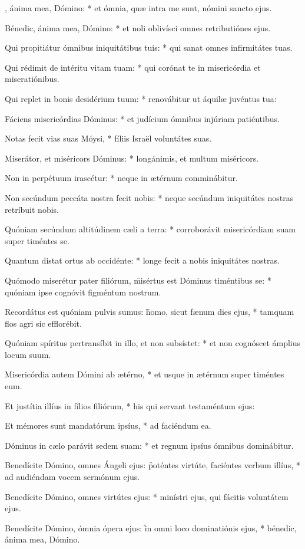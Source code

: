 \begin{psalmus}

, ánima mea, Dómino: * et ómnia, quæ intra me sunt, nómini sancto ejus.

Bénedic, ánima mea, Dómino: * et noli oblivísci omnes retributiónes ejus.

Qui propitiátur ómnibus iniquitátibus tuis: * qui sanat omnes infirmitátes tuas.

Qui rédimit de intéritu vitam tuam: * qui corónat te in misericórdia et miseratiónibus.

Qui replet in bonis desidérium tuum: * renovábitur ut áquilæ juvéntus tua:

Fáciens misericórdias Dóminus: * et judícium ómnibus injúriam patiéntibus.

Notas fecit vias suas Móysi, * fíliis Israël voluntátes suas.

Miserátor, et miséricors Dóminus: * longánimis, et multum miséricors.

Non in perpétuum irascétur: * neque in ætérnum comminábitur.

Non secúndum peccáta nostra fecit nobis: * neque secúndum iniquitátes nostras retríbuit nobis.

Quóniam secúndum altitúdinem cæli a terra: * corroborávit misericórdiam suam super timéntes se.

Quantum distat ortus ab occidénte: * longe fecit a nobis iniquitátes nostras.

Quómodo miserétur pater filiórum, \f misértus est Dóminus timéntibus se: * quóniam ipse cognóvit figméntum nostrum.

Recordátus est quóniam pulvis sumus: \f homo, sicut fænum dies ejus, * tamquam flos agri sic efflorébit.

Quóniam spíritus pertransíbit in illo, et non subsístet: * et non cognóscet ámplius locum suum.

Misericórdia autem Dómini ab ætérno, * et usque in ætérnum super timéntes eum.

Et justítia illíus in fílios filiórum, * his qui servant testaméntum ejus:

Et mémores sunt mandatórum ipsíus, * ad faciéndum ea.

Dóminus in cælo parávit sedem suam: * et regnum ipsíus ómnibus dominábitur.

Benedícite Dómino, omnes Ángeli ejus: \f poténtes virtúte, faciéntes verbum illíus, * ad audiéndam vocem sermónum ejus.

Benedícite Dómino, omnes virtútes ejus: * minístri ejus, qui fácitis voluntátem ejus.

Benedícite Dómino, ómnia ópera ejus: \f in omni loco dominatiónis ejus, * bénedic, ánima mea, Dómino.

\end{psalmus}
